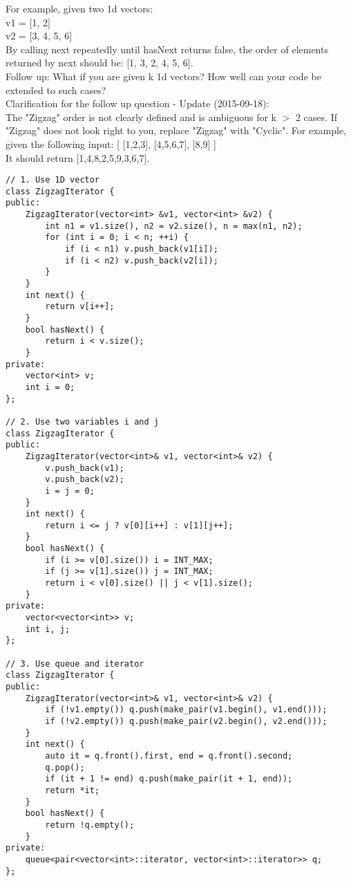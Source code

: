 For example, given two 1d vectors:\\
v1 = [1, 2]\\
v2 = [3, 4, 5, 6]\\
By calling next repeatedly until hasNext returns false, the order of elements returned by next should be: [1, 3, 2, 4, 5, 6].\\

Follow up: What if you are given k 1d vectors? How well can your code be extended to such cases?\\

Clarification for the follow up question - Update (2015-09-18):\\
The "Zigzag" order is not clearly defined and is ambiguous for k $>$ 2 cases. If "Zigzag" does not look right to you, replace "Zigzag" with "Cyclic". For example, given the following input: [ [1,2,3], [4,5,6,7], [8,9] ]\\
It should return [1,4,8,2,5,9,3,6,7].\\

\begin{lstlisting}
// 1. Use 1D vector
class ZigzagIterator {
public:
    ZigzagIterator(vector<int> &v1, vector<int> &v2) {
        int n1 = v1.size(), n2 = v2.size(), n = max(n1, n2);
        for (int i = 0; i < n; ++i) {
            if (i < n1) v.push_back(v1[i]);
            if (i < n2) v.push_back(v2[i]);
        }
    }
    int next() {
        return v[i++];
    }
    bool hasNext() {
        return i < v.size();
    }
private:
    vector<int> v;
    int i = 0;
};

// 2. Use two variables i and j
class ZigzagIterator {
public:
    ZigzagIterator(vector<int>& v1, vector<int>& v2) {
        v.push_back(v1);
        v.push_back(v2);
        i = j = 0;
    }
    int next() {
        return i <= j ? v[0][i++] : v[1][j++];
    }
    bool hasNext() {
        if (i >= v[0].size()) i = INT_MAX;
        if (j >= v[1].size()) j = INT_MAX;
        return i < v[0].size() || j < v[1].size();
    }
private:
    vector<vector<int>> v;
    int i, j;
};

// 3. Use queue and iterator
class ZigzagIterator {
public:
    ZigzagIterator(vector<int>& v1, vector<int>& v2) {
        if (!v1.empty()) q.push(make_pair(v1.begin(), v1.end()));
        if (!v2.empty()) q.push(make_pair(v2.begin(), v2.end()));
    }
    int next() {
        auto it = q.front().first, end = q.front().second;
        q.pop();
        if (it + 1 != end) q.push(make_pair(it + 1, end));
        return *it;
    }
    bool hasNext() {
        return !q.empty();
    }
private:
    queue<pair<vector<int>::iterator, vector<int>::iterator>> q;
};
\end{lstlisting}


